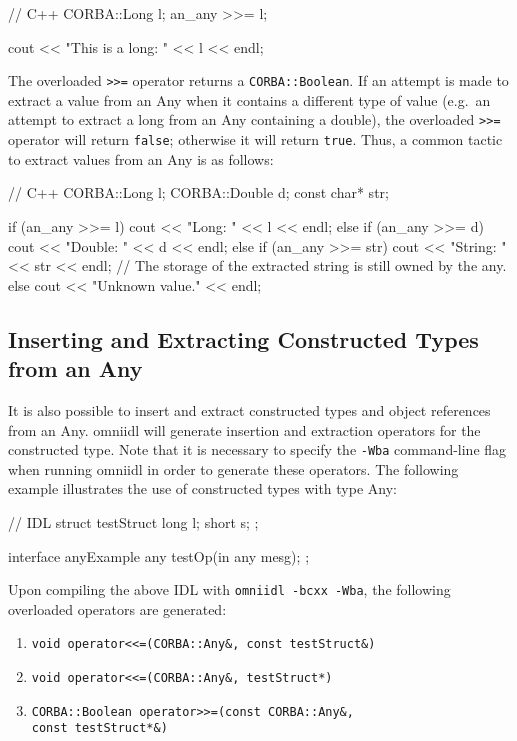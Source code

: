 \documentclass[11pt,twoside,a4paper]{book}
\newcommand{\type}[1]{\texttt{#1}}
\newcommand{\code}[1]{\texttt{#1}}
\begin{document}
\begin{cxxlisting}
// C++
CORBA::Long l;
an_any >>= l;

cout << "This is a long: " << l << endl;
\end{cxxlisting}


The overloaded \code{>{}>=} operator returns a \type{CORBA::Boolean}.
If an attempt is made to extract a value from an Any when it contains
a different type of value (e.g.\ an attempt to extract a long from an
Any containing a double), the overloaded \code{>{}>=} operator will
return \code{false}; otherwise it will return \code{true}. Thus, a
common tactic to extract values from an Any is as follows:

\begin{cxxlisting}
// C++
CORBA::Long l;
CORBA::Double d;
const char* str;

if (an_any >>= l) {
  cout << "Long: " << l << endl;
}
else if (an_any >>= d) {
  cout << "Double: " << d << endl;
}
else if (an_any >>= str) {
  cout << "String: " << str << endl;
  // The storage of the extracted string is still owned by the any.
}
else {
  cout << "Unknown value." << endl;
}
\end{cxxlisting}


\subsection{Inserting and Extracting Constructed Types from an Any}

It is also possible to insert and extract constructed types and object
references from an Any. omniidl will generate insertion and extraction
operators for the constructed type. Note that it is necessary to
specify the \texttt{-Wba} command-line flag when running omniidl in
order to generate these operators. The following example illustrates
the use of constructed types with type Any:

\begin{idllisting}
// IDL
struct testStruct {
  long l;
  short s;
};

interface anyExample {
  any testOp(in any mesg);
};
\end{idllisting}

Upon compiling the above IDL with \texttt{omniidl -bcxx -Wba}, the
following overloaded operators are generated:

\begin{enumerate}
\item \verb|void operator<<=(CORBA::Any&, const testStruct&)|
\item \verb|void operator<<=(CORBA::Any&, testStruct*)|
\item \verb|CORBA::Boolean operator>>=(const CORBA::Any&,|\\
      \verb|const testStruct*&)|
\end{enumerate}
\end{document}
